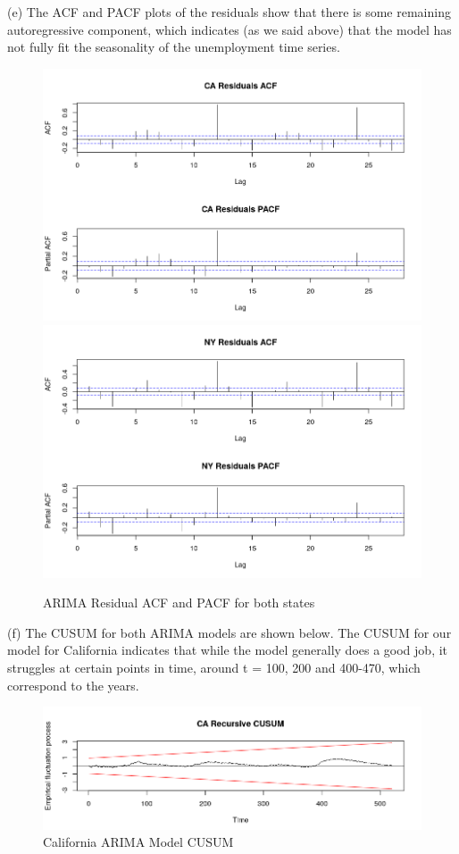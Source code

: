 \documentclass{article}
\begin{document}
\noindent (e) The ACF and PACF plots of the residuals show that there is some remaining autoregressive component, which indicates (as we said above) that the model has not fully fit the seasonality of the unemployment time series. 
 \begin{figure}[H]
	
	\includegraphics[width=380pt]{ca_residuals_acf}
	\includegraphics[width=380pt]{ny_residuals_acf}
	\caption{ARIMA Residual ACF and PACF for both states} 
\end{figure}


\noindent (f) The CUSUM for both ARIMA models are shown below. The CUSUM for our model for California indicates that while the model generally does a good job, it struggles at certain points in time, around t = 100, 200 and 400-470, which correspond to the years. 


\begin{figure}[H]
	
	\includegraphics[width=\linewidth]{ca_cusum}
	\caption{California ARIMA Model CUSUM } 
\end{figure}
\end{document}
